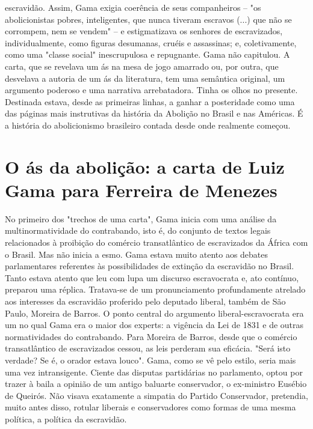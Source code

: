 {escravidão. Assim, Gama exigia coerência de seus companheiros -- "os
abolicionistas pobres, inteligentes, que nunca tiveram escravos (...)
que não se corrompem, nem se vendem" -- e estigmatizava os senhores de
escravizados, individualmente, como figuras desumanas, cruéis e
assassinas; e, coletivamente, como uma "classe social" inescrupulosa e
repugnante. Gama não capitulou. A carta, que se revelava um ás na mesa
de jogo amarrado ou, por outra, que desvelava a autoria de um ás da
literatura, tem uma semântica original, um argumento poderoso e uma
narrativa arrebatadora. Tinha os olhos no presente. Destinada estava,
desde as primeiras linhas, a ganhar a posteridade como uma das páginas
mais instrutivas da história da Abolição no Brasil e nas Américas. É a
história do abolicionismo brasileiro contada desde onde realmente
começou. }

\part{O ás da abolição: a carta de Luiz Gama para Ferreira de Menezes}

\pagebreak
\mbox{}\vfill
\thispagestyle{empty}

{\small\noindent
No primeiro dos "trechos de uma carta", Gama inicia com uma
análise da multinormatividade do contrabando, isto é, do conjunto de
textos legais relacionados à proibição do comércio transatlântico de
escravizados da África com o Brasil. Mas não inicia a esmo. Gama estava
muito atento aos debates parlamentares referentes às possibilidades de
extinção da escravidão no Brasil. Tanto estava atento que leu com lupa
um discurso escravocrata e, ato contínuo, preparou uma réplica.
Tratava-se de um pronunciamento profundamente atrelado aos interesses da
escravidão proferido pelo deputado liberal, também de São Paulo, Moreira
de Barros. O ponto central do argumento liberal-escravocrata era um no
qual Gama era o maior dos experts: a vigência da Lei de 1831 e de outras
normatividades do contrabando. Para Moreira de Barros, desde que o
comércio transatlântico de escravizados cessou, as leis perderam sua
eficácia. "Será isto verdade? Se é, o orador estava louco". Gama, como
se vê pelo estilo, seria mais uma vez intransigente. Ciente das disputas
partidárias no parlamento, optou por trazer à baila a opinião de um
antigo baluarte conservador, o ex-ministro Eusébio de Queirós. Não
visava exatamente a simpatia do Partido Conservador, pretendia, muito
antes disso, rotular liberais e conservadores como formas de uma mesma
política, a política da escravidão. }

